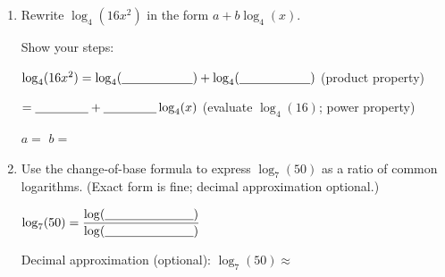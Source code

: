 \documentclass[10pt]{article}
\begin{document}
\namedateperiod

\vspace{0.18in}

\begin{enumerate}[leftmargin=1.8em, itemsep=18pt]

\item Rewrite $\log_4(16x^2)$ in the form $a + b\log_4(x)$.

\vspace{6pt}
Show your steps:

\vspace{4pt}
$\log_4(16x^2) = \log_4(\blank{2cm}) + \log_4(\blank{2cm})$
\hfill (product property)

\vspace{8pt}
$= \blank{1.5cm} + \blank{1.5cm}\log_4(x)$
\hfill (evaluate $\log_4(16)$; power property)

\vspace{8pt}
$a = $ \blank{2cm} \qquad $b = $ \blank{2cm}

\vspace{12pt}

\item Use the change-of-base formula to express $\log_7(50)$ as a ratio of common logarithms.
      (Exact form is fine; decimal approximation optional.)

\vspace{6pt}
$\log_7(50) = \dfrac{\log(\blank{2.5cm})}{\log(\blank{2.5cm})}$

\vspace{10pt}
Decimal approximation (optional): $\log_7(50) \approx $ \blank{2.5cm}

\end{enumerate}
\end{document}
